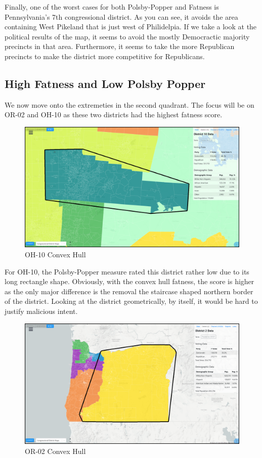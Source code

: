 \documentclass[letterpaper]{article}
\begin{document}
Finally, one of the worst cases for both Polsby-Popper and Fatness is Pennsylvania's 7th congressional district. As you can see, it avoids the area containing West Pikeland that is just west of Philidelpia. If we take a look at the political results of the map, it seems to avoid the mostly Democractic majority precincts in that area. Furthermore, it seems to take the more Republican precincts to make the district more competitive for Republicans.

\subsection{High Fatness and Low Polsby Popper}
We now move onto the extremeties in the second quadrant. The focus will be on OR-02 and OH-10 as these two districts had the highest fatness score.

\begin{figure}[H]
	\includegraphics[width=\linewidth]{./figures/OH-10-ConvexHull.png}
	\caption{OH-10 Convex Hull}
	\label{fig:oh10convexHull}
\end{figure}

For OH-10, the Polsby-Popper measure rated this district rather low due to its long rectangle shape. Obviously, with the convex hull fatness, the score is higher as the only major difference is the removal the staircase shaped northern border of the district. Looking at the district geometrically, by itself, it would be hard to justify malicious intent.

\begin{figure}[H]
	\includegraphics[width=\linewidth]{./figures/OR-02-ConvexHull.png}
	\caption{OR-02 Convex Hull}
	\label{fig:or02convexHull}
\end{figure}
\end{document}
